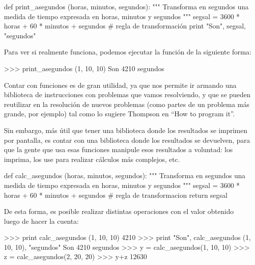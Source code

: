 \begin{codigo-python}
def print_asegundos (horas, minutos, segundos):
    """ Transforma en segundos una medida de tiempo expresada en
        horas, minutos y segundos """
    segsal = 3600 * horas + 60 * minutos + segundos  # regla de transformación
    print "Son", segsal, "segundos"
\end{codigo-python}

Para ver si realmente funciona, podemos ejecutar la función de la siguiente
forma:

\begin{codigo-python-sn}
>>> print_asegundos (1, 10, 10)
Son 4210 segundos
\end{codigo-python-sn}

Contar con funciones es de gran utilidad, ya que nos permite ir armando una
biblioteca de instrucciones con problemas que vamos resolviendo, y que se
pueden reutilizar en la resolución de nuevos problemas (como partes de un
problema más grande, por ejemplo) tal como lo sugiere Thompson en ``How to
program it''.

Sin embargo, más útil que tener una biblioteca donde los resultados
se imprimen por pantalla, es contar con una biblioteca donde los
resultados se devuelven, para que la gente que usa esas funciones manipule
esos resultados a voluntad: los imprima, los use para realizar cálculos
más complejos, etc.

\begin{codigo-python}
def calc_asegundos (horas, minutos, segundos):
    """ Transforma en segundos una medida de tiempo expresada en
        horas, minutos y segundos """
    segsal = 3600 * horas + 60 * minutos + segundos  # regla de transformacion
    return segsal
\end{codigo-python}

De esta forma, es posible realizar distintas operaciones con el valor obtenido
luego de hacer la cuenta:

\begin{codigo-python-sn}
>>> print calc_asegundos (1, 10, 10)
4210
>>> print "Son", calc_asegundos (1, 10, 10), "segundos"
Son 4210 segundos
>>> y = calc_asegundos(1, 10, 10)
>>> z = calc_asegundos(2, 20, 20)
>>> y+z
12630
\end{codigo-python-sn}


